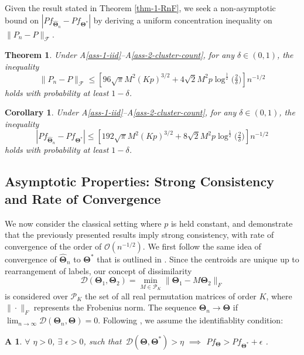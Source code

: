 \documentclass[11pt]{article}
\newcommand{\bTheta}{\boldsymbol{\Theta}}
\newcommand{\hth}{\widehat{\bTheta}_n}
\newtheorem{thm}{Theorem}[section]
\newtheorem{cor}{Corollary}[section]
\newtheorem{assumption}{A\hspace{-4pt}}
\begin{document}
Given the result stated in Theorem \ref{thm-1-RnF}, we seek a non-asymptotic bound on $|P f_{\widehat{\bm{\Theta}}_n}-Pf_{\bm{\Theta}^*}|$ by deriving a uniform concentration inequality on $\|P_n-P\|_{\mathcal{F}}$.

\begin{thm}\label{thm-2-diff-Pn-P}
    Under A\ref{ass-1-iid}--A\ref{ass-2-cluster-count}, for any $\delta\in(0,1)$, the inequality 
    \[\|P_n-P\|_\mathcal{F}\le \left[96\sqrt{\pi}M^2(Kp)^{3/2} + 4\sqrt{2} M^2p\log^{\frac{1}{2}}\big(\tfrac{2}{\delta}\big) \right] n^{-1/2}\]
    holds with probability at least $1-\delta$.
\end{thm}


\begin{cor}
    Under A\ref{ass-1-iid}--A\ref{ass-2-cluster-count}, for any $\delta\in(0,1)$, the inequality%
    \[|P f_{\widehat{\bm{\Theta}}_n}-Pf_{\bm{\Theta}^*}|\le \left[192\sqrt{\pi}M^2(Kp)^{3/2} + 8\sqrt{2} M^2p\log^{\frac{1}{2}}\big(\tfrac{2}{\delta}\big) \right] n^{-1/2}\]
    holds with probability at least $1-\delta$.
\end{cor}


\subsection{Asymptotic Properties: Strong Consistency and Rate of Convergence}

We now consider the classical setting where $p$ is held constant, and demonstrate that the previously presented results imply strong consistency, with rate of convergence of the order of $\mathcal{O}(n^{-1/2})$. We first follow the same idea of convergence of $\hth$ to $\bTheta^\ast$ that is outlined in \cite{pollard1981strong}. Since the centroids are unique up to rearrangement of labels, our concept of dissimilarity
\[\mathcal{D}(\bTheta_1,\bTheta_2) = \min_{M \in \mathscr{P}_K} \|\bTheta_1 - M \bTheta_2\|_F \]
is considered over $\mathscr{P}_K$ the set of all real permutation matrices of order $K$, where $\|\cdot\|_F$ represents the
Frobenius norm. The sequence $\bTheta_n\to \bTheta$ if $\lim_{n\to \infty} \mathcal{D}(\bTheta_n,\bTheta)=0$. Following \cite{terada2014strong,chakraborty2020entropy}, we assume the identifiablity condition:

\begin{assumption}\label{ass-3-diss}
    $\forall$ $ \eta>0$, $\exists$ $\epsilon>0$, such that $\, \mathcal{D}(\bTheta,\bTheta^\ast)> \eta$ $\implies$ $P f_{\bTheta} > P f_{\bTheta^\ast} + \epsilon$ .
\end{assumption}
\end{document}
